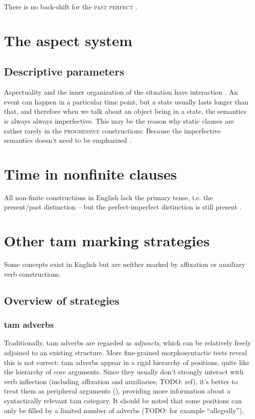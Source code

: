 \documentclass[UTF8, a4paper, oneside, scheme=plain]{ctexrep}
\newcommand*{\citepage}[1]{p.~{#1}}
\newcommand*{\term}[1]{\emph{#1}}
\newcommand{\category}[1]{\textsc{#1}}
\begin{document}
There is no back-shift for the \category{past perfect} \citep[\citepage{156}]{cgel}.

\section{The aspect system}

\subsection{Descriptive parameters}

Aspectuality and the inner organization of the situation have interaction
\citep[\citepage{127}]{cgel}.
An event can happen in a particular time point,
but a state usually lasts longer than that,
and therefore when we talk about an object being in a state,
the semantics is always always imperfective.
This may be the reason why 
static clauses are rather rarely in the \category{progressive} constructions:
Because the imperfective semantics doesn't need to be emphasized
\citep[\citepage{124}]{cgel}.

\section{Time in nonfinite clauses}

All non-finite constructions in English lack the primary tense, i.e. the present/past distinction
-- but the perfect-imperfect distinction is still present
\citep[\citepage{159}]{cgel}.

\section{Other \acs{tam} marking strategies}

Some concepts exist in English but are neither marked by affixation or auxiliary verb constructions.

\subsection{Overview of strategies}

\subsubsection{\acs{tam} adverbs}\label{sec:tam.adverbs}

Traditionally, \acs{tam} adverbs are regarded as \term{adjuncts},
which can be relatively freely adjoined to an existing structure.
More fine-grained morphosyntactic tests reveal this is not correct:
\acs{tam} adverbs appear in a rigid hierarchy of positions, 
quite like the hierarchy of core arguments.
Since they usually don't strongly interact with verb inflection
(including affixation and auxiliaries; TODO: ref),
it's better to treat them as peripheral arguments (),
providing more information about a syntactically relevant \acs{tam} category.
It should be noted that some positions can only be filled by a limited number of adverbs (TODO: for example ``allegedly''),
\end{document}

